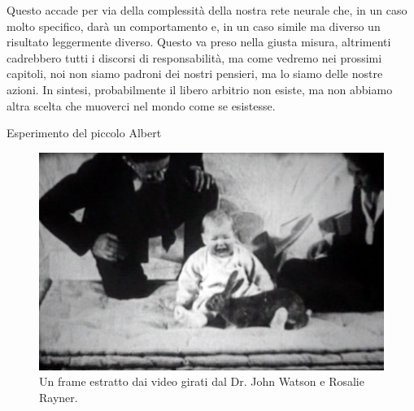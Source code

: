 \documentclass[12pt]{book} %
\begin{document}
Questo accade per via della complessità della nostra rete neurale che, in un caso molto specifico, darà un comportamento
e, in un caso simile ma diverso un risultato leggermente diverso. Questo va preso nella giusta misura, altrimenti
cadrebbero tutti i discorsi di responsabilità, ma come vedremo nei prossimi capitoli, noi non siamo padroni dei nostri
pensieri, ma lo siamo delle nostre azioni. In sintesi, probabilmente il libero arbitrio non esiste, ma non abbiamo
altra scelta che muoverci nel mondo come se esistesse.

\needspace{4cm}
\begin{mdframed}[linewidth=1pt]
Esperimento del piccolo Albert

\begin{figure}
  \centering
  \includegraphics[width=0.95\linewidth]{images/Libro-img002.jpg}
  \begin{minipage}{\linewidth}
    \caption{Un frame estratto dai video girati dal Dr. John Watson e Rosalie Rayner.}
  \end{minipage}
\end{figure}


\end{mdframed}
\end{document}

